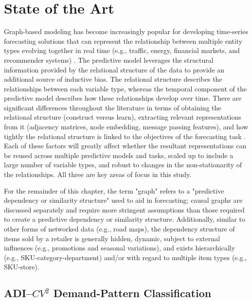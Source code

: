 \chapter{State of the Art}

Graph-based modeling has become increasingly popular for developing time-series forecasting solutions that can represent the relationship between multiple entity types evolving together in real time (e.g., traffic, energy, financial markets, and recommender systems) \cite{jin2024survey,li2018dcrnn,yu2018stgcn}. The predictive model leverages the structural information provided by the relational structure of the data to provide an additional source of inductive bias. The relational structure describes the relationships between each variable type, whereas the temporal component of the predictive model describes how these relationships develop over time. There are significant differences throughout the literature in terms of obtaining the relational structure (construct versus learn), extracting relevant representations from it (adjacency matrices, node embedding, message passing features), and how tightly the relational structure is linked to the objectives of the forecasting task \cite{jin2024survey,wu2019graphwavenetdeepspatialtemporal,wu2020connectingdotsmultivariatetime}. Each of these factors will greatly affect whether the resultant representations can be reused across multiple predictive models and tasks, scaled up to include a large number of variable types, and robust to changes in the non-stationarity of the relationships. All three are key areas of focus in this study.

For the remainder of this chapter, the term "graph" refers to a "predictive dependency or similarity structure" used to aid in forecasting; causal graphs are discussed separately and require more stringent assumptions than those required to create a predictive dependency or similarity structure. Additionally, similar to other forms of networked data (e.g., road maps), the dependency structure of items sold by a retailer is generally hidden, dynamic, subject to external influences (e.g., promotions and seasonal variations), and exists hierarchically (e.g., SKU-category-department) and/or with regard to multiple item types (e.g., SKU-store).

\section{ADI--\texorpdfstring{$CV^2$}{CV	extasciicircum 2} Demand-Pattern Classification}
\label{subsec:adi_cv2_classification_ch2}

